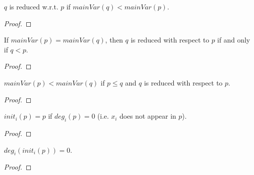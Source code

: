 \begin{lemma}
    \label{lem:reducedTo_of_max_vars_lt}
    \leanok
    $q$ is reduced w.r.t. $p$ if $mainVar(q) < mainVar(p)$.
\end{lemma}

\begin{proof}
    \leanok
\end{proof}

\begin{lemma}
    \label{lem:reducedTo_iff_gt_of_max_vars_eq}
    \leanok
    If $mainVar(p) = mainVar(q)$, then $q$ is reduced with respect to $p$ if and only if $q < p$.
\end{lemma}

\begin{proof}
    \leanok
\end{proof}

\begin{lemma}
    \label{lem:max_vars_lt_of_reducedTo_of_le}
    \leanok
    $mainVar(p) < mainVar(q)$ if $p \le q$ and $q$ is reduced with respect to $p$.
\end{lemma}

\begin{proof}
    \leanok
\end{proof}

\begin{lemma}
    \label{lem:initialOf_eq_of_degreeOf_eq_zero}
    \leanok
    $init_i(p) = p$ if $deg_i(p) = 0$ (i.e. $x_i$ does not appear in $p$).
\end{lemma}

\begin{proof}
    \leanok
\end{proof}

\begin{lemma}
    \label{lem:degreeOf_initialOf_self}
    \leanok
    $deg_i(init_i(p)) = 0$.
\end{lemma}

\begin{proof}
    \leanok
\end{proof}

